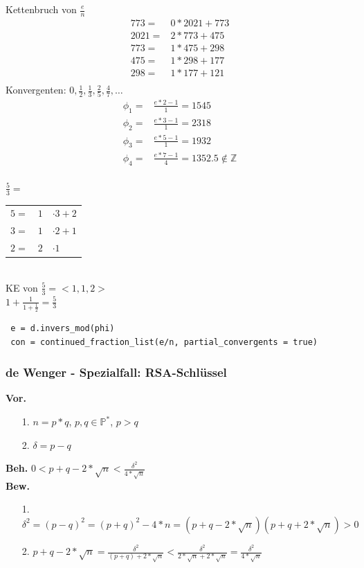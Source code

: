 \documentclass[landscape,twocolumn,a4paper]{article}
\newcommand{\PN}{\mathbb{P}} %
\newcommand{\Bold}[1]{\textbf{#1}} %
\begin{document}
\begin{multicols}{2}
Kettenbruch von $\frac{e}{n}$\\
\begin{align*}
773 =& 0 * 2021 + 773 \\
2021 =& 2*773 + 475 \\
773 =& 1*475 + 298 \\
475 =& 1*298 + 177 \\
298 =& 1*177 + 121 \\
\end{align*}
Konvergenten: $0, \frac{1}{2}, \frac{1}{3}, \frac{2}{5}, \frac{4}{7}, \ldots$
\begin{align*}
\phi_1 =& \frac{e*2-1}{1} = 1545\\
\phi_2 =& \frac{e*3-1}{1} = 2318\\
\phi_3 =& \frac{e*5-1}{1} = 1932\\
\phi_4 =& \frac{e*7-1}{4} = 1352.5 \notin \mathbb{Z}\\
\end{align*}
\end{multicols}
$\frac{5}{3}=$\\
\begin{tabular}{l|c|l}\cline{2-1}
 $5=$&$1$&$\cdot3+2$\\
 $3=$&$1$&$\cdot2+1$\\
 $2=$&$2$&$\cdot1$\\\cline{2-1}
\end{tabular}\\\linebreak
{\color{red}KE von $\frac{5}{3}=<1,1,2>$}\\
$1+\frac{1}{1+\frac{1}{2}}=\frac{5}{3}$\\
\begin{lstlisting}
 e = d.invers_mod(phi)
 con = continued_fraction_list(e/n, partial_convergents = true)
\end{lstlisting}
\subsubsection{de Wenger - Spezialfall: RSA-Schlüssel}
\Bold{Vor.}
\begin{itemize}
	\item[1.] $n=p*q$, $p,q \in \PN^*$, $p>q$ 
	\item[2.] $\delta=p-q$
\end{itemize}
\Bold{Beh.} $0 < p+q - 2 * \sqrt{n} < \frac{\delta^2}{4 * \sqrt{n}}$ \\
\Bold{Bew.}
\begin{itemize}
	\item[1.] $\delta^2= (p-q)^2=(p+q)^2-4*n=(p+q-2*\sqrt{n})(p+q+2*\sqrt{n})>0$ 
	\item[2.] $p+q-2*\sqrt{n} = \frac{\delta^2}{(p+q)+2*\sqrt{n}} < \frac{\delta^2}{2*\sqrt{n}+2*\sqrt{n}}= \frac{\delta^2}{4 * \sqrt{n}}$
\end{itemize}
\end{document}
